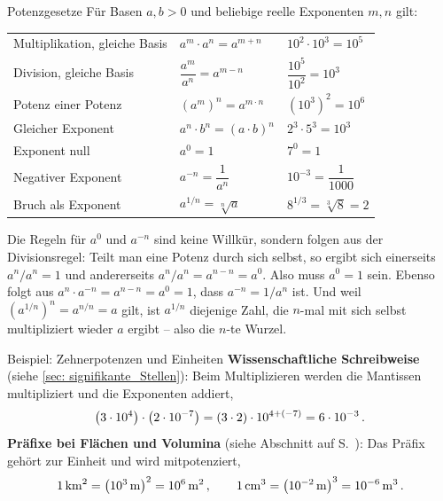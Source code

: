 \begin{rememberbox}[]{Potenzgesetze}
    Für Basen $a, b > 0$ und beliebige reelle Exponenten $m, n$ gilt:
    \begin{center}
    \renewcommand{\arraystretch}{1.6}
    \begin{tabular}{l l l}
        Multiplikation, gleiche Basis & $a^m \cdot a^n = a^{m+n}$ & $10^2 \cdot 10^3 = 10^5$ \\
        Division, gleiche Basis & $\dfrac{a^m}{a^n} = a^{m-n}$ & $\dfrac{10^5}{10^2} = 10^3$ \\
        Potenz einer Potenz & $\left(a^m\right)^n = a^{m \cdot n}$ & $\left(10^3\right)^2 = 10^6$ \\
        Gleicher Exponent & $a^n \cdot b^n = (a \cdot b)^n$ & $2^3 \cdot 5^3 = 10^3$ \\
        Exponent null & $a^0 = 1$ & $7^0 = 1$ \\
        Negativer Exponent & $a^{-n} = \dfrac{1}{a^n}$ & $10^{-3} = \dfrac{1}{1000}$ \\
        Bruch als Exponent & $a^{1/n} = \sqrt[n]{a}$ & $8^{1/3} = \sqrt[3]{8} = 2$ \\
    \end{tabular}
    \end{center}
\end{rememberbox}

Die Regeln für $a^0$ und $a^{-n}$ sind keine Willkür, sondern folgen aus der Divisionsregel: Teilt man eine Potenz durch sich selbst, so ergibt sich einerseits $a^n/a^n = 1$ und andererseits $a^n/a^n = a^{n-n} = a^0$. Also muss $a^0 = 1$ sein. Ebenso folgt aus $a^n \cdot a^{-n} = a^{n-n} = a^0 = 1$, dass $a^{-n} = 1/a^n$ ist. Und weil $\left(a^{1/n}\right)^n = a^{n/n} = a$ gilt, ist $a^{1/n}$ diejenige Zahl, die $n$-mal mit sich selbst multipliziert wieder $a$ ergibt -- also die $n$-te Wurzel.

\begin{examplebox}[]{Beispiel: Zehnerpotenzen und Einheiten}
    \textbf{Wissenschaftliche Schreibweise} (siehe \cref{sec: signifikante_Stellen}): Beim Multiplizieren werden die Mantissen multipliziert und die Exponenten addiert,
    \begin{equation*}
        \left(3 \cdot 10^{4}\right) \cdot \left(2 \cdot 10^{-7}\right) = (3 \cdot 2) \cdot 10^{4 + (-7)} = 6 \cdot 10^{-3} \,.
    \end{equation*}
    \textbf{Präfixe bei Flächen und Volumina} (siehe Abschnitt  auf S.~\pageref{sec: Einheitenpräfixe}): Das Präfix gehört zur Einheit und wird mitpotenziert,
    \begin{equation*}
        \SI{1}{\kilo\meter\squared} = \left(10^3\,\mathrm{m}\right)^2 = 10^6\,\mathrm{m}^2 \,{,}\, \qquad
        \SI{1}{\centi\meter\cubed} = \left(10^{-2}\,\mathrm{m}\right)^3 = 10^{-6}\,\mathrm{m}^3 \,.
    \end{equation*}
\end{examplebox}

